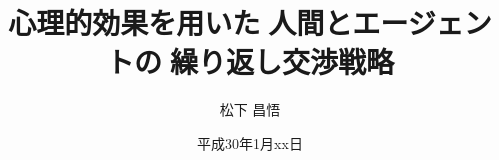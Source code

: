\usepackage{gra_yasuda}
\usepackage{lscape}
\usepackage{graphicx}
\usepackage{here}
\usepackage{color}
\usepackage{amsmath}
\usepackage{subfig}
\usepackage{tascmac}
\usepackage{url}
\usepackage{ascmac}
\usepackage{booktabs}
\usepackage{otf}
\usepackage{comment}



\title{心理的効果を用いた人間とエージェントの繰り返し交渉戦略}

\author{松下 昌悟}



\date{平成30年1月xx日}



\setlength{\baselineskip}{8truemm}
